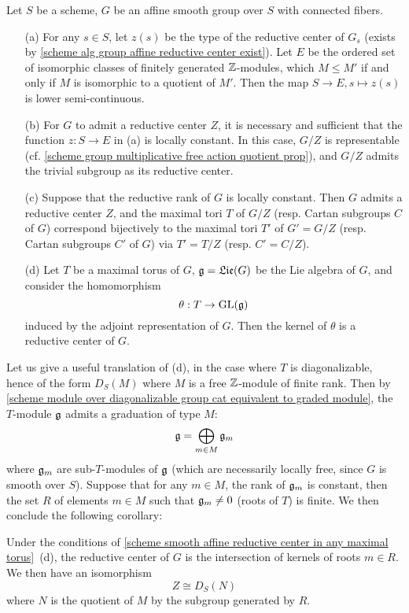 \begin{theorem}\label{scheme smooth affine connected fiber reductive center exist if}
Let $S$ be a scheme, $G$ be an affine smooth group over $S$ with connected fibers.
\begin{enumerate}
    \item[(a)] For any $s\in S$, let $z(s)$ be the type of the reductive center of $G_s$ (exists by \cref{scheme alg group affine reductive center exist}). Let $E$ be the ordered set of isomorphic classes of finitely generated $\mathbb{Z}$-modules, which $M\leq M'$ if and only if $M$ is isomorphic to a quotient of $M'$. Then the map $S\to E,s\mapsto z(s)$ is lower semi-continuous.
    \item[(b)] For $G$ to admit a reductive center $Z$, it is necessary and sufficient that the function $z:S\to E$ in (a) is locally constant. In this case, $G/Z$ is representable (cf. \cref{scheme group multiplicative free action quotient prop}), and $G/Z$ admits the trivial subgroup as its reductive center.
    \item[(c)] Suppose that the reductive rank of $G$ is locally constant. Then $G$ admits a reductive center $Z$, and the maximal tori $T$ of $G/Z$ (resp. Cartan subgroups $C$ of $G$) correspond bijectively to the maximal tori $T'$ of $G'=G/Z$ (resp. Cartan subgroups $C'$ of $G$) via $T'=T/Z$ (resp. $C'=C/Z$).
    \item[(d)] Let $T$ be a maximal torus of $G$, $\mathfrak{g}=\mathfrak{Lie}(G)$ be the Lie algebra of $G$, and consider the homomorphism
    \[\theta:T\to\mathrm{GL}(\mathfrak{g})\]
    induced by the adjoint representation of $G$. Then the kernel of $\theta$ is a reductive center of $G$.
\end{enumerate}
\end{theorem}

Let us give a useful translation of (d), in the case where $T$ is diagonalizable, hence of the form $D_S(M)$ where $M$ is a free $\mathbb{Z}$-module of finite rank. Then by \cref{scheme module over diagonalizable group cat equivalent to graded module}, the $T$-module $\mathfrak{g}$ admits a graduation of type $M$:
\[\mathfrak{g}=\bigoplus_{m\in M}\mathfrak{g}_m\]
where $\mathfrak{g}_m$ are sub-$T$-modules of $\mathfrak{g}$ (which are necessarily locally free, since $G$ is smooth over $S$). Suppose that for any $m\in M$, the rank of $\mathfrak{g}_m$ is constant, then the set $R$ of elements $m\in M$ such that $\mathfrak{g}_m\neq 0$ (roots of $T$) is finite. We then conclude the following corollary:

\begin{corollary}\label{scheme smooth affine diagonalizable maximal torus reductive center char}
Under the conditions of \cref{scheme smooth affine reductive center in any maximal torus}~(d), the reductive center of $G$ is the intersection of kernels of roots $m\in R$. We then have an isomorphism
\[Z\cong D_S(N)\]
where $N$ is the quotient of $M$ by the subgroup generated by $R$.
\end{corollary}

